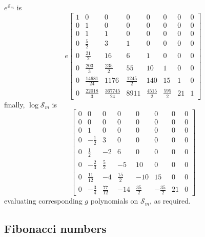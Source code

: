 $e^{\mathcal{S}_{m}}$ is
\begin{displaymath}
e \left[\begin{matrix}1 & 0 & 0 & 0 & 0 & 0 & 0 & 0\\0 & 1 & 0 & 0 & 0 & 0 & 0 & 0\\0 & 1 & 1 & 0 & 0 & 0 & 0 & 0\\0 & \frac{5}{2} & 3 & 1 & 0 & 0 & 0 & 0\\0 & \frac{21}{2} & 16 & 6 & 1 & 0 & 0 & 0\\0 & \frac{203}{3} & \frac{235}{2} & 55 & 10 & 1 & 0 & 0\\0 & \frac{14681}{24} & 1176 & \frac{1245}{2} & 140 & 15 & 1 & 0\\0 & \frac{22018}{3} & \frac{367745}{24} & 8911 & \frac{4515}{2} & \frac{595}{2} & 21 & 1\end{matrix}\right]
\end{displaymath}
finally, $\log{\mathcal{S}_{m}}$ is
\begin{displaymath}
\left[\begin{matrix}0 & 0 & 0 & 0 & 0 & 0 & 0 & 0\\0 & 0 & 0 & 0 & 0 & 0 & 0 & 0\\0 & 1 & 0 & 0 & 0 & 0 & 0 & 0\\0 & - \frac{1}{2} & 3 & 0 & 0 & 0 & 0 & 0\\0 & \frac{1}{2} & -2 & 6 & 0 & 0 & 0 & 0\\0 & - \frac{2}{3} & \frac{5}{2} & -5 & 10 & 0 & 0 & 0\\0 & \frac{11}{12} & -4 & \frac{15}{2} & -10 & 15 & 0 & 0\\0 & - \frac{3}{4} & \frac{77}{12} & -14 & \frac{35}{2} & - \frac{35}{2} & 21 & 0\end{matrix}\right]
\end{displaymath}
evaluating corresponding $g$ polynomials on $\mathcal{S}_{m}$, as required.

\subsection{Fibonacci numbers}

